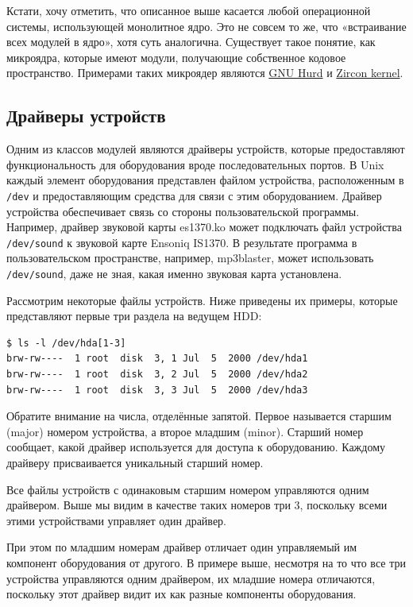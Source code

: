\documentclass[10pt, oneside]{book}
\begin{document}
Кстати, хочу отметить, что описанное выше касается любой операционной системы, использующей монолитное ядро. Это не совсем то же, что «встраивание всех модулей в ядро», хотя суть аналогична. Существует такое понятие, как микроядра, которые имеют модули, получающие собственное кодовое пространство. Примерами таких микроядер являются \href{https://www.gnu.org/software/hurd/}{GNU Hurd} и \href{https://fuchsia.dev/fuchsia-src/concepts/kernel}{Zircon kernel}.

\subsection{Драйверы устройств}
\label{sec:device_drivers}
Одним из классов модулей являются драйверы устройств, которые предоставляют функциональность для оборудования вроде последовательных портов. В Unix каждый
элемент оборудования представлен файлом устройства, расположенным в \verb|/dev| и предоставляющим средства для связи с этим оборудованием. Драйвер устройства обеспечивает связь со стороны пользовательской программы. Например, драйвер
звуковой карты es1370.ko может подключать файл устройства \verb|/dev/sound| к звуковой карте
Ensoniq IS1370. В результате программа в пользовательском пространстве, например,
mp3blaster, может использовать \verb|/dev/sound|, даже не зная, какая именно звуковая карта установлена.

Рассмотрим некоторые файлы устройств. Ниже приведены их примеры, которые представляют первые три раздела на ведущем HDD:

\begin{verbatim}
$ ls -l /dev/hda[1-3]
brw-rw----  1 root  disk  3, 1 Jul  5  2000 /dev/hda1
brw-rw----  1 root  disk  3, 2 Jul  5  2000 /dev/hda2
brw-rw----  1 root  disk  3, 3 Jul  5  2000 /dev/hda3
\end{verbatim}

Обратите внимание на числа, отделённые запятой. Первое называется старшим (major) номером устройства, а второе младшим (minor). Старший номер сообщает, какой драйвер используется для доступа к оборудованию. Каждому драйверу присваивается уникальный старший номер.

Все файлы устройств с одинаковым старшим номером управляются одним драйвером. Выше мы видим в качестве таких номеров три 3, поскольку всеми этими устройствами управляет один драйвер.

При этом по младшим номерам драйвер отличает один управляемый им компонент оборудования от другого. В примере выше, несмотря на то что все три устройства
управляются одним драйвером, их младшие номера отличаются, поскольку этот драйвер видит их как разные компоненты оборудования.
\end{document}
